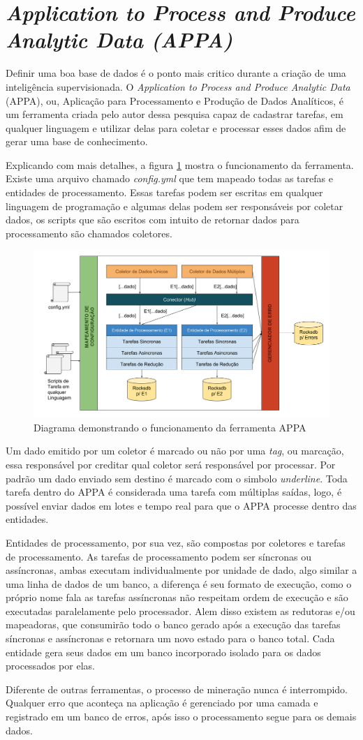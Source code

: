 \section{\textit{Application to Process and Produce Analytic Data (APPA)}}

Definir uma boa base de dados é o ponto mais critico durante a criação de uma inteligência supervisionada. O \textit{Application to Process and Produce Analytic Data} (APPA), ou, Aplicação para Processamento e Produção de Dados Analíticos, é um ferramenta criada pelo autor dessa pesquisa capaz de cadastrar tarefas, em qualquer linguagem e utilizar delas para coletar e processar esses dados afim de gerar uma base de conhecimento.

Explicando com mais detalhes, a figura \ref{fig:appa_eng} mostra o funcionamento da ferramenta. Existe uma arquivo chamado \textit{config.yml} que tem mapeado todas as tarefas e entidades de processamento. Essas tarefas podem ser escritas em qualquer linguagem de programação e algumas delas podem ser responsáveis por coletar dados, os scripts que são escritos com intuito de retornar dados para processamento são chamados coletores.

\begin{figure}
    \centering
    \includegraphics[width=.8\textwidth]{imagens/appa_eng.png}
    \caption{Diagrama demonstrando o funcionamento da ferramenta APPA}
    \label{fig:appa_eng}
\end{figure}

Um dado emitido por um coletor é marcado ou não por uma \textit{tag}, ou marcação, essa responsável por creditar qual coletor será responsável por processar. Por padrão um dado enviado sem destino é marcado com o simbolo \textit{underline}. Toda tarefa dentro do APPA é considerada uma tarefa com múltiplas saídas, logo, é possível enviar dados em lotes e tempo real para que o APPA processe dentro das entidades. 

Entidades de processamento, por sua vez, são compostas por coletores e tarefas de processamento. As tarefas de processamento podem ser síncronas ou assíncronas, ambas executam individualmente por unidade de dado, algo similar a uma linha de dados de um banco, a diferença é seu formato de execução, como o próprio nome fala as tarefas assíncronas não respeitam ordem de execução e são executadas paralelamente pelo processador. Alem disso existem as redutoras e/ou mapeadoras, que consumirão todo o banco gerado após a execução das tarefas síncronas e assíncronas e retornara um novo estado para o banco total. Cada entidade gera seus dados em um banco incorporado isolado para os dados processados por elas.

Diferente de outras ferramentas, o processo de mineração nunca é interrompido. Qualquer erro que aconteça na aplicação é gerenciado por uma camada e registrado em um banco de erros, após isso o processamento segue para os demais dados.
